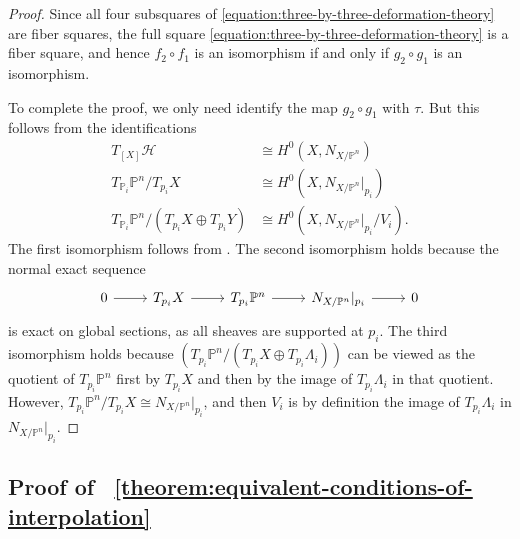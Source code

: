 \documentclass[reqno, 11pt]{amsart}
\theoremstyle{definition}
\theoremstyle{remark}
\numberwithin{equation}{section}
\numberwithin{thm}{section}
\numberwithin{prop}{section}
\numberwithin{lem}{section}
\numberwithin{cor}{section}
\numberwithin{conj}{section}
\numberwithin{defn}{section}
\theoremstyle{plain}
\theoremstyle{definition}
\newcommand\ssec{\subsection}
\newcommand\bp{{\mathbb P}}
\newcommand\sch{\mathscr H}
\begin{document}
\begin{proof}
Since all four subsquares of \eqref{equation:three-by-three-deformation-theory}
are fiber squares, the full square \eqref{equation:three-by-three-deformation-theory} is a fiber square,
and hence $f_2 \circ f_1$ is an isomorphism if and only if $g_2 \circ g_1$ is an isomorphism.

To complete the proof, we only need identify the map $g_2 \circ g_1$ with $\tau$.
But this follows from the identifications
\begin{align*}
	T_{[X]} \sch &\cong H^0(X, N_{X/\bp^n}) \\
	T_{\bp_i} \bp^n/T_{p_i} X &\cong H^0(X, N_{X/\bp^n}|_{p_i}) \\
	T_{\bp_i} \bp^n/\left(T_{p_i} X \oplus T_{p_i} Y  \right) &\cong H^0(X, N_{X/\bp^n}|_{p_i}/V_i).
\end{align*}
The first isomorphism follows from \cite[Theorem 1.1(b)]{Hartshorne:deformation}.
The second isomorphism holds because the normal exact sequence
\begin{equation}
\nonumber
	\begin{tikzcd}
	  0 \ar{r} &  T_{p_i}X \ar{r} & T_{p_i} \bp^n \ar{r} & N_{X/\bp^n}|_{p_i} \ar{r} & 0 
	\end{tikzcd}\end{equation}
is exact on global sections, as all sheaves are supported at $p_i$.
The third isomorphism holds because
$\left( T_{p_i} \bp^n / \left( T_{p_i} X \oplus T_{p_i} \Lambda_i \right) \right)$ can be viewed as the
quotient of $T_{p_i} \bp^n$ first by $T_{p_i} X$ and then by the image of $T_{p_i} \Lambda_i$ in that quotient.
However, $T_{p_i} \bp^n / T_{p_i} X \cong N_{X/\bp^n}|_{p_i}$, and then
$V_i$ is by definition the image of $T_{p_i} \Lambda_i$ in $N_{X/\bp^n}|_{p_i}$.
\end{proof}

\ssec{Proof of ~\autoref{theorem:equivalent-conditions-of-interpolation}}
\label{ssec:proof-of-equivalent-conditions-of-interpolation}
\end{document}
